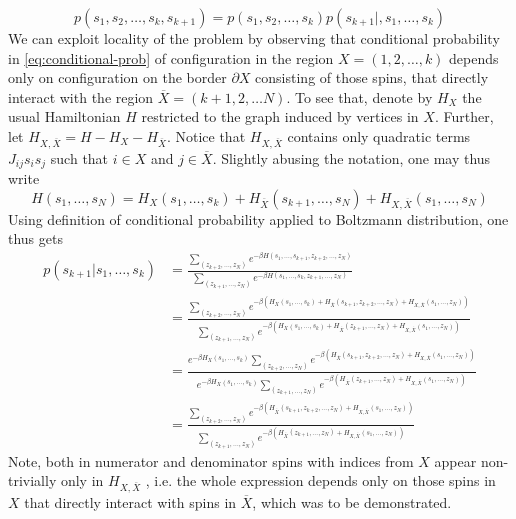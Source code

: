 \begin{equation}
  \label{eq:conditional-prob}
  p(s_1, s_2, \ldots, s_k, s_{k+1}) = p(s_1, s_2, \ldots, s_k)p(s_{k+1}|, s_1, \ldots, s_k)
\end{equation}
We can exploit locality of the problem by observing that conditional
probability in \eqref{eq:conditional-prob} of configuration in the region $X =
  (1, 2, \ldots, k)$ depends only on configuration on the border $\partial X$ consisting of those spins, that directly interact with the region
$\overline{X} = (k+1, 2, \ldots N)$. To see that, denote by $H_X$ the usual
    Hamiltonian $H$ restricted to the graph induced by vertices in $X$. Further,
    let $H_{X, \overline{X}} = H - H_X - H_{\overline{X}}$. Notice that $H_{X,
    \overline{X}}$ contains only quadratic terms $J_{ij} s_i s_j$ such that $i \in
  X$ and $j \in \overline{X}$. Slightly abusing the notation, one may thus write
    \begin{equation}
      H(s_1, \ldots, s_N) = H_X(s_1, \ldots, s_k) + H_{\overline{X}}(s_{k+1}, \ldots, s_N) + H_{X, \overline{X}}(s_1, \ldots, s_N)
    \end{equation}
    Using definition of conditional probability applied to Boltzmann distribution,
    one thus gets
    \begin{align}
      p(s_{k+1}|s_1, \ldots, s_k) & = \frac{\sum\limits_{(z_{k+2}, \ldots, z_N)}e^{-\beta H(s_1, \ldots, s_{k+1}, z_{k+2},\ldots,z_N)}}{\sum\limits_{(z_{k+1}, \ldots, z_N)}e^{-\beta H(s_1, \ldots, s_k, z_{k+1},\ldots,z_N)}}                                                                                                                                                     \\
                                  & = \frac{\sum\limits_{(z_{k+2}, \ldots, z_N)}e^{-\beta (H_X(s_1, \ldots, s_k) + H_{\overline{X}}(s_{k+1}, z_{k+2},\ldots,z_N) + H_{X, \overline{X}}(s_1, \ldots, z_N))}}{\sum\limits_{(z_{k+1}, \ldots, z_N)}e^{-\beta (H_X(s_1, \ldots, s_k) + H_{\overline{X}}(z_{k+1}, \ldots,z_N) + H_{X, \overline{X}}(s_1, \ldots, z_N))}}                 \\
                                  & = \frac{e^{-\beta H_X(s_1, \ldots, s_k)}\sum\limits_{(z_{k+2}, \ldots, z_N)} e^{-\beta(H_{\overline{X}}(s_{k+1}, z_{k+2},\ldots,z_N) + H_{X, \overline{X}}(s_1, \ldots, z_N))}}{e^{-\beta H_X(s_1, \ldots, s_k)}\sum\limits_{(z_{k+1}, \ldots, z_N)}e^{ -\beta(H_{\overline{X}}(z_{k+1}, \ldots,z_N) + H_{X, \overline{X}}(s_1, \ldots, z_N))}} \\
                                  & = \frac{\sum\limits_{(z_{k+2}, \ldots, z_N)} e^{-\beta(H_{\overline{X}}(s_{k+1}, z_{k+2},\ldots,z_N) + H_{X, \overline{X}}(s_1, \ldots, z_N))}}{\sum\limits_{(z_{k+1}, \ldots, z_N)}e^{ -\beta(H_{\overline{X}}(z_{k+1}, \ldots,z_N) + H_{X, \overline{X}}(s_1, \ldots, z_N))}}
    \end{align}
    Note, both in numerator and denominator spins with indices from $X$ appear
    non-trivially only in $H_{X, \overline{X}}$ , i.e. the whole expression depends
    only on those spins in $X$ that directly interact with spins in $\overline{X}$,
which was to be demonstrated.

